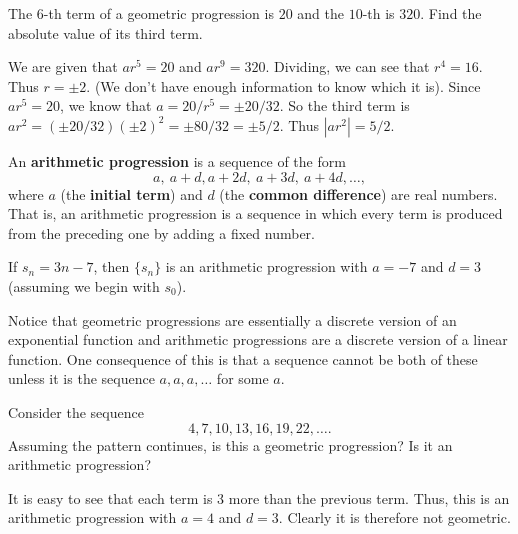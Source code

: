 \begin{exer}
The $6$-th term of a geometric progression is $20$ and the $10$-th
is $320$. Find  the absolute value of its third term.

\vspace{2in}
\begin{answer}
We are given that $ar^5 = 20$ and $ar^9 = 320$. 
Dividing, we can see that $r^4=16$.  Thus $r=\pm 2$.
(We don't have enough information to know which it is).
Since $ar^5=20$, we know that $a=20/r^5=\pm 20/32$.
So the third term is $ar^2=(\pm 20/32)(\pm 2)^2=\pm 80/32 = \pm 5/2$.
Thus $|ar^2|=5/2$.
\end{answer}
\end{exer}

\begin{df}
An {\bf arithmetic progression} is a sequence of the form
$$ a, \ a+d, a+2d,\ a+3d, \ a+4d, \ldots,$$
where $a$ (the {\bf initial term}) and $d$ (the {\bf common difference}) are real numbers.
That is, an arithmetic progression is a sequence in which every term is
produced from the preceding one by adding a fixed number.
\end{df}

\begin{exa}
If $s_n=3n-7$, then $\{s_n\}$ is an arithmetic progression with $a=-7$ and $d=3$ (assuming we
begin with $s_0$).
\end{exa}

\begin{rem}
Notice that geometric progressions are essentially a discrete version of an exponential
function and arithmetic progressions are a discrete version of a linear function.
One consequence of this is that a sequence cannot be both of these unless it is the
sequence $a,a,a,\ldots$ for some $a$.
\end{rem}

\begin{exa}
Consider the sequence 
$$4, 7, 10, 13, 16, 19, 22,\ldots.$$  Assuming the pattern continues,
is this a geometric progression?  Is it an arithmetic progression?
\begin{sol}
It is easy to see that each term is 3 more than the previous term.  Thus, this is
an arithmetic progression with $a=4$ and $d=3$.   Clearly it is therefore not geometric. 
\end{sol}
\end{exa}


